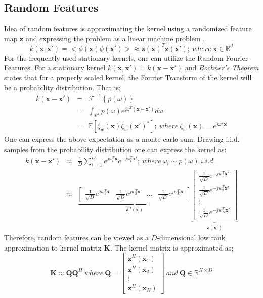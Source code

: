 \documentclass{article}
\begin{document}
\subsection{Random Features}
Idea of random features is approximating the kernel using a randomized feature map $\mathbf{z}$ and expressing the problem as a linear machine problem \cite{randomfeatures}. 
\begin{equation}
k(\mathbf{x},\mathbf{x'})=<\phi(\mathbf{x})\phi(\mathbf{x'})>\approx \mathbf{z}(\mathbf{x})^T\mathbf{z}(\mathbf{x'}); \>where\> \mathbf{x} \in \mathbb{R}^d
\end{equation}
For the frequently used stationary kernels, one can utilize the Random Fourier Features. For a stationary kernel $k(\mathbf{x},\mathbf{x'})=k(\mathbf{x}-\mathbf{x'})$ and \textit{Bochner's Theorem} states that for a properly scaled kernel, the Fourier Transform of the kernel will be a probability distribution. That is; 
\begin{eqnarray}
k(\mathbf{x}-\mathbf{x'})&=&\mathcal{F}^{-1}\left\{p(\omega)\right\} \nonumber \\
&=&\int_{\mathbb{R}^d}p(\omega)e^{j\omega^T(\mathbf{x}-\mathbf{x'})}d\omega \nonumber \\
&=&\mathbb{E}[\zeta_w(\mathbf{x})\zeta_w(\mathbf{x'})^*]; \>where \> \zeta_w(\mathbf{x})=e^{j\omega^T\mathbf{x}}
\end{eqnarray}
One can express the above expectation as a monte-carlo sum. Drawing i.i.d. samples from the probability distribution one can express the kernel as:
\begin{eqnarray}
k(\mathbf{x}-\mathbf{x'})&\approx& \frac{1}{D}\sum_{i=1}^De^{j\omega_i^T\mathbf{x}}e^{-j\omega_i^T\mathbf{x'}}; \> where \> \omega_i\sim p(\omega) \> i.i.d. \nonumber \\
&\approx& \underbrace{\begin{bmatrix}
\frac{1}{\sqrt{D}} e^{jw_1^T\mathbf{x}}& \frac{1}{\sqrt{D}} e^{jw_2^T\mathbf{x}}
& \dots
& \frac{1}{\sqrt{D}} e^{jw_D^T\mathbf{x}}
\end{bmatrix} }_{\mathbf{z}^H(\mathbf{x})}
\underbrace{\begin{bmatrix}
\frac{1}{\sqrt{D}} e^{-jw_1^T\mathbf{x'}}\\ \frac{1}{\sqrt{D}} e^{-jw_2^T\mathbf{x'}}
\\ \vdots
\\ \frac{1}{\sqrt{D}} e^{-jw_D^T\mathbf{x'}}
\end{bmatrix}}_{\mathbf{z}(\mathbf{x'})}
\end{eqnarray}
Therefore, random features can be viewed as a $D$-dimensional low rank approximation to kernel matrix $\mathbf{K}$. The kernel matrix is approximated as;
\begin{equation}
\mathbf{K}\approx\mathbf{Q}\mathbf{Q}^H\>where \> \mathbf{Q}=
\begin{bmatrix}
\mathbf{z}^H(\mathbf{x}_1)\\ \mathbf{z}^H(\mathbf{x}_2)
\\ \vdots
\\\mathbf{z}^H(\mathbf{x}_N)
\end{bmatrix} \>and\> \mathbf{Q} \in \mathbb{R}^{N\times D}
\end{equation}
\end{document}
